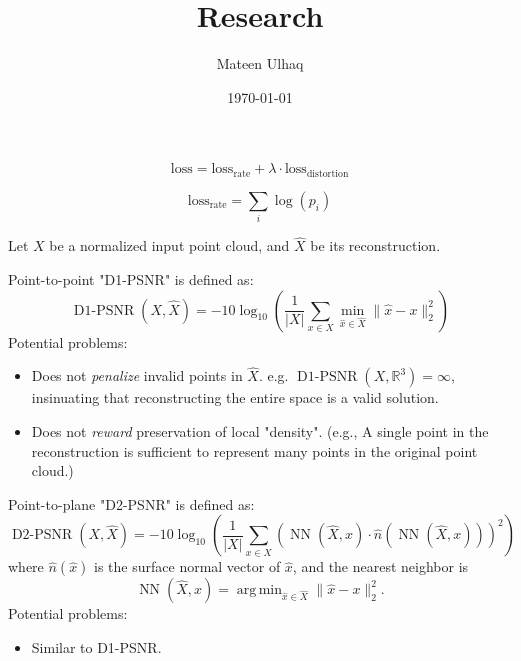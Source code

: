 \documentclass[12pt]{extarticle}
\title{Research}
\author{Mateen Ulhaq}
\date{\today}
\DeclareMathOperator*{\argmin}{arg\,min}
\begin{document}
\maketitle

\[ \textrm{loss} = \textrm{loss}_\textrm{rate} + \lambda \cdot
\textrm{loss}_\textrm{distortion} \]

\[ \textrm{loss}_\textrm{rate} = \sum_i \log(p_i) \]

\noindent
\hrulefill

\noindent
Let $X$ be a normalized input point cloud, and $\hat{X}$ be its reconstruction.

\noindent
\hrulefill

\noindent
Point-to-point "D1-PSNR" is defined as:
\[
  \operatorname{D1-PSNR}(X, \hat{X})
  = -10 \log_{10} \left(
    \frac{1}{|X|} \sum_{x \in X} \min_{\hat{x} \in \hat{X}} \lVert \hat{x} - x \rVert_2^2
  \right)
\]
%
Potential problems:
\begin{itemize}
  \item Does not \emph{penalize} invalid points in $\hat{X}$.
    e.g. $\operatorname{D1-PSNR}(X, \mathbb{R}^3) = \infty$, insinuating that reconstructing the entire space is a valid solution.
  \item Does not \emph{reward} preservation of local "density". (e.g., A single point in the reconstruction is sufficient to represent many points in the original point cloud.)
\end{itemize}

\noindent
\hrulefill


\noindent
Point-to-plane "D2-PSNR" is defined as:
\[
  \operatorname{D2-PSNR}(X, \hat{X})
  = -10 \log_{10} \left(
    \frac{1}{|X|} \sum_{x \in X} \left(\operatorname{NN}(\hat{X}, x) \cdot \hat{n}({\operatorname{NN}(\hat{X}, x)})\right)^2
  \right)
\]
where
$\hat{n}(\hat{x})$ is the surface normal vector of $\hat{x}$, and the nearest neighbor is
\[
  \operatorname{NN}(\hat{X}, x) = \argmin_{\hat{x} \in \hat{X}} \lVert \hat{x} - x \rVert_2^2.
\]
%
Potential problems:
\begin{itemize}
  \item Similar to D1-PSNR.
\end{itemize}
\end{document}
